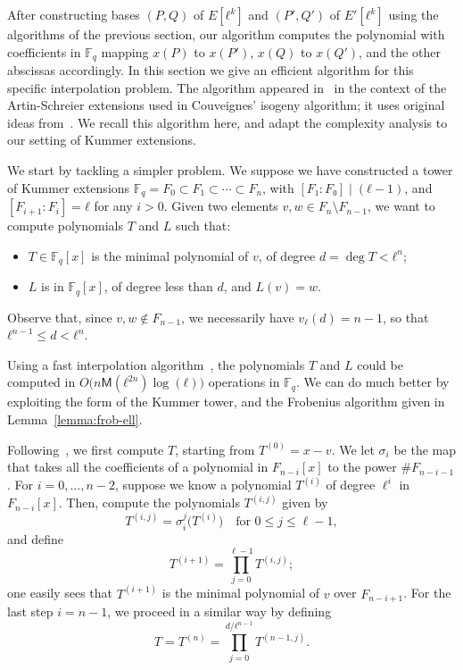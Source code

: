 \documentclass{lms}
\def\cout#1{\mathsf{#1}}
\newcommand{\F}{\mathbb{F}}
\newcommand{\MM}{\cout{M}}
\begin{document}
After constructing bases $(P,Q)$ of $E[ℓ^k]$ and $(P',Q')$ of
$E'[ℓ^k]$ using the algorithms of the previous section, our algorithm
computes the polynomial with coefficients in $\F_q$ mapping $x(P)$ to
$x(P')$, $x(Q)$ to $x(Q')$, and the other abscissas accordingly.  In
this section we give an efficient algorithm for this specific
interpolation problem. The algorithm appeared in~\cite{df10} in the
context of the Artin-Schreier extensions used in Couveignes' isogeny
algorithm; it uses original ideas from~\cite{enge+morain03}. We recall
this algorithm here, and adapt the complexity analysis to our setting 
of Kummer extensions.


We start by tackling a simpler problem. We suppose we have constructed
a tower of Kummer extensions $\F_q=F_0⊂F_1⊂\cdots⊂F_n$, with
$[F₁:F₀]\mid(ℓ-1)$, and $[F_{i+1}:F_i]=ℓ$ for any $i>0$. Given two
elements $v,w∈F_n\setminus F_{n-1}$, we want to compute polynomials
$T$ and $L$ such that:
\begin{itemize}
\item $T \in \F_q[x]$ is the minimal polynomial of $v$, of degree
  $d=\deg T<ℓ^n$;
\item $L$ is in $\F_q[x]$, of degree less than $d$, and $L(v)=w$.
\end{itemize}
Observe that, since $v,w∉F_{n-1}$, we necessarily have $v_ℓ(d)=n-1$,
so that $ℓ^{n-1}≤d<ℓ^n$.

Using a fast interpolation algorithm~\cite[Chapter~10.2]{vzGG}, the
polynomials $T$ and $L$ could be computed in
$O\bigl(n\MM(ℓ^{2n})\log(ℓ)\bigr)$ operations in $\F_q$. We can do
much better by exploiting the form of the Kummer tower, and the
Frobenius algorithm given in Lemma~\ref{lemma:frob-ell}.

Following~\cite{df10}, we first compute $T$, starting from
$T^{(0)}=x-v$.  We let $\sigma_i$ be the map that takes all the
coefficients of a polynomial in $F_{n-i}[x]$ to the power
$\#F_{n-i-1}$. For $i=0,\dots,n-2$, suppose we know a polynomial
$T^{(i)}$ of degree $\ell^i$ in $F_{n-i}[x]$. Then, compute the
polynomials $T^{(i,j)}$ given by
\begin{equation*}
  T^{(i,j)}= \sigma_i^j\bigl (T^{(i)} \bigr)
  \quad\text{for $0 \le j \le \ell-1$},
\end{equation*}
and define
$$T^{(i+1)}=\prod_{j=0}^{\ell-1} T^{(i,j)};$$ one easily sees that
$T^{(i+1)}$ is the minimal polynomial of $v$ over $F_{n-i+1}$. For the
last step $i=n-1$, we proceed in a similar way by defining
\begin{equation*}
  T = T^{(n)}=\prod_{j=0}^{d/ℓ^{n-1}} T^{(n-1,j)}.
\end{equation*}
\end{document}
